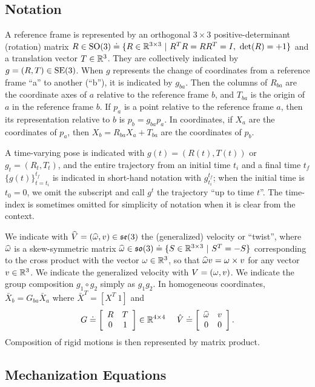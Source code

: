 \subsection{Notation}

A reference frame is represented by an orthogonal $3\times 3$ positive-determinant (rotation) matrix $R \in \SO(3) \doteq \{ R \in \real^{3\times 3} \ | \ R^T R = R R^T = I, \ {\operatorname{det}}(R) = +1\}$ and a translation vector $T \in \real^3$. They are collectively indicated by $g = (R, T) \in \SE(3)$. When $g$ represents the change of coordinates from a reference frame ``a'' to another (``b''), it is indicated by $g_{ba}$. Then the columns of $R_{ba}$ are the coordinate axes of $a$ relative to the reference frame $b$, and $T_{ba}$ is the origin of $a$ in the reference frame $b$. If $p_a$ is a point relative to the reference frame $a$, then its representation relative to $b$ is $p_b = g_{ba} p_a$. In coordinates, if $X_a$ are the coordinates of $p_a$, then $X_b = R_{ba}X_a + T_{ba}$ are the coordinates of $p_b$. 

A time-varying pose is indicated with $g(t) = (R(t), T(t))$ or $g_t = (R_t, T_t)$, and the entire trajectory from an initial time $t_i$ and a final time $t_f$ $\{g(t) \}_{t = t_i}^{t_f}$ is indicated in short-hand notation with $g_{t_i}^{t_f}$; when the initial time is $t_0 = 0$, we omit the subscript and call $g^{t}$ the trajectory ``up to time $t$''. The time-index is sometimes omitted for simplicity of notation when it is clear from the context.

We indicate with $\widehat V = (\widehat \w, v) \in \se(3)$ the (generalized) velocity or ``twist'', where $\widehat \w$ is a skew-symmetric matrix $\widehat \w \in \so(3) \doteq \{S \in \real^{3\times 3} \ | \ S^T = -S\}$ corresponding to the cross product with the vector $\w \in \real^3$, so that $\widehat \w v = \w \times v$ for any vector $v\in \real^3$. We indicate the generalized velocity with $V = (\w, v)$. We indicate the group composition $g_1 \circ g_2$ simply as $g_1 g_2$. 
In homogeneous coordinates, $\bar X_b = G_{ba} \bar X_a$ where $\bar X^T = [X^T \ 1]$ and 
\begin{equation}
G \doteq \ba{cc} R & T \\ 0 & 1 \ea \in \real^{4\times 4}
~~~~
\hat V \doteq \ba{cc} \widehat \w & v \\ 0 & 0 \ea.
\end{equation}
Composition of rigid motions is then represented by matrix product.


\subsection{Mechanization Equations}

